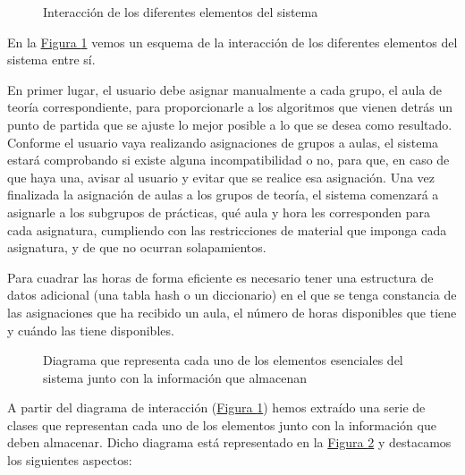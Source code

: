 \begin{figure}[!h]
    \centering
    
    \caption{Interacción de los diferentes elementos del sistema}
    \label{interaccion}
\end{figure}

En la \hyperref[interaccion]{Figura \ref*{interaccion}} vemos un esquema de la interacción de los diferentes elementos del sistema entre sí. 

En primer lugar, el usuario debe asignar manualmente a cada grupo, el aula de teoría correspondiente, para proporcionarle a los algoritmos que vienen detrás un punto de partida que se ajuste lo mejor posible a lo que se desea como resultado. Conforme el usuario vaya realizando asignaciones de grupos a aulas, el sistema estará comprobando si existe alguna incompatibilidad o no, para que, en caso de que haya una, avisar al usuario y evitar que se realice esa asignación. Una vez finalizada la asignación de aulas a los grupos de teoría, el sistema comenzará a asignarle a los subgrupos de prácticas, qué aula y hora les corresponden para cada asignatura, cumpliendo con las restricciones de material que imponga cada asignatura, y de que no ocurran solapamientos.

Para cuadrar las horas de forma eficiente es necesario tener una estructura de datos adicional (una tabla hash o un diccionario) en el que se tenga constancia de las asignaciones que ha recibido un aula, el número de horas disponibles que tiene y cuándo las tiene disponibles.

\begin{figure}[!h]
    \centering
    
    \caption{Diagrama que representa cada uno de los elementos esenciales del sistema junto con la información que almacenan}
    \label{clases}
\end{figure}

A partir del diagrama de interacción (\hyperref[interaccion]{Figura \ref*{interaccion}}) hemos extraído una serie de clases que representan cada uno de los elementos junto con la información que deben almacenar. Dicho diagrama está representado en la \hyperref[clases]{Figura \ref*{clases}} y destacamos los siguientes aspectos:

